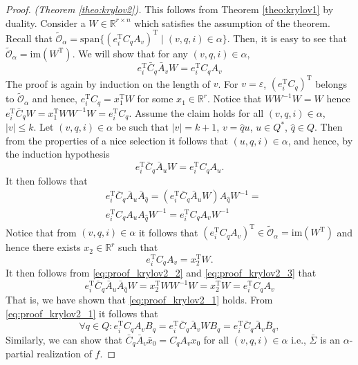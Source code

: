 \documentclass[journal]{IEEEtran}
\newcommand{\IM}{\mathrm{im}}
\newcommand{\SPAN}{\mathrm{span}}
\begin{document}
\begin{proof}\emph{(Theorem \ref{theo:krylov2}).}
	This follows from Theorem \ref{theo:krylov1} by duality. Consider a $W \in \mathbb{R}^{r \times n}$ which satisfies the assumption of the theorem. Recall that $\widetilde{\mathscr{O}}_\alpha = \SPAN \{ (e_i^\mathrm{T}C_qA_v)^\mathrm{T} \mid (v,q,i) \in \alpha \}$. Then, it is easy to see that $\widetilde{\mathscr{O}}_\alpha = \IM (W^{\mathrm{T}})$. We will show that for any $(v,q,i) \in \alpha$,
	\begin{equation} \label{eq:proof_krylov2_1}
		e_i^{\mathrm{T}}\bar{C}_q\bar{A}_vW=e_i^{\mathrm{T}}C_qA_v
	\end{equation}
	The proof is again by induction on the length of $v$. For $v=\varepsilon$, $(e_i^{\mathrm{T}}C_q)^\mathrm{T}$ belongs to $\widetilde{\mathscr{O}}_{\alpha}$ and hence, $e_i^{\mathrm{T}}C_q=x_1^{\mathrm{T}}W$ for some $x_1 \in \mathbb{R}^r$. Notice that $WW^{-1}W=W$ hence $e_i^{\mathrm{T}}\bar{C}_qW=x_1^{\mathrm{T}}WW^{-1}W=e_i^{\mathrm{T}}C_q$. Assume the claim holds for all $(v,q,i) \in \alpha$, $|v| \leq k$. Let $(v,q,i) \in \alpha$ be such that $|v|=k+1$, $v=\hat{q}u$, $u \in Q^*$, $\hat{q} \in Q$. Then from the properties of a nice selection it follows that $(u,q,i) \in \alpha$, and hence, by the induction hypothesis
	\[ e_i^{\mathrm{T}}\bar{C}_q\bar{A}_uW=e_i^{\mathrm{T}}C_qA_u. \]
	It then follows that
	\begin{equation} \label{eq:proof_krylov2_2}
		\begin{aligned} 
			& e_i^{\mathrm{T}}\bar{C}_q\bar{A}_u\bar{A}_{\hat{q}}=(e_i^{\mathrm{T}}\bar{C}_q\bar{A}_uW)A_{\hat{q}}W^{-1}= \\
			& e_i^{\mathrm{T}}C_qA_uA_{\hat{q}}W^{-1}=e_i^{\mathrm{T}}C_qA_vW^{-1}
		\end{aligned}
	\end{equation}
	Notice that from $(v,q,i) \in \alpha$ it follows that $(e_i^{\mathrm{T}}C_qA_v)^\mathrm{T} \in \widetilde{\mathscr{O}}_{\alpha} = \IM (W^\mathrm{T})$ and hence there exists $x_2 \in \mathbb{R}^r$ such that
	\begin{equation} \label{eq:proof_krylov2_3}
		e_i^{\mathrm{T}}C_qA_v=x_2^{\mathrm{T}}W.
	\end{equation}
	It then follows from \eqref{eq:proof_krylov2_2} and \eqref{eq:proof_krylov2_3} that
	\[ e_i^{\mathrm{T}}\bar{C}_q\bar{A}_u\bar{A}_{\hat{q}}W=x_2^{\mathrm{T}}WW^{-1}W=x_2^{\mathrm{T}}W=e_i^{\mathrm{T}}C_qA_v \]
	That is, we have shown that \eqref{eq:proof_krylov2_1} holds. From \eqref{eq:proof_krylov2_1} it follows that
	\[ \forall q \in Q: e_i^{\mathrm{T}}C_qA_vB_q=e_i^{\mathrm{T}}\bar{C}_q\bar{A}_vWB_q=e_i^{\mathrm{T}}\bar{C}_q\bar{A}_v\bar{B}_q, \]
	Similarly, we can show that $\bar{C}_q\bar{A}_v\bar{x}_0=C_qA_vx_0$ for all $(v,q,i) \in \alpha$ i.e., $\bar{\Sigma}$ is an $\alpha$-partial realization of $f$.
\end{proof}
\end{document}
